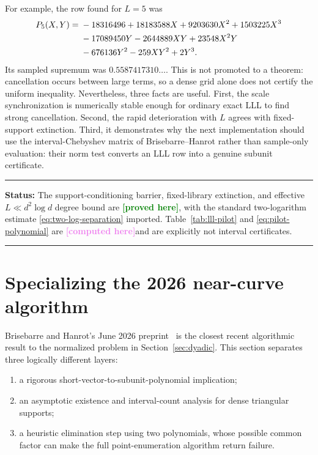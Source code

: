 \documentclass[11pt,oneside]{article}
\theoremstyle{definition}
\theoremstyle{remark}
\newcommand{\statusproved}{\textcolor{green}{\textbf{[proved here]}}}
\newcommand{\statuscomputed}{\textcolor{violet}{\textbf{[computed here]}}}
\newenvironment{statusbox}[1]
{\begin{center}\begin{minipage}{0.95\textwidth}\raggedright\hrule
\vspace{0.45em}\textbf{Status:} #1\par\vspace{0.35em}}
{\vspace{0.35em}\hrule\end{minipage}\end{center}}
\begin{document}
For example, the row found for $L=5$ was
\begin{align}
P_{5}(X,Y)={}&-18316496+18183588X+9203630X^2+1503225X^3 \notag\\
 &-17089450Y-2644889XY+23548X^2Y \notag\\
 &-676136Y^2-259XY^2+2Y^3.
\label{eq:pilot-polynomial}
\end{align}
Its sampled supremum was $0.5587417310\ldots$.  This is not promoted to a theorem: cancellation
occurs between large terms, so a dense grid alone does not certify the uniform inequality.
Nevertheless, three facts are useful.  First, the scale synchronization is numerically stable
enough for ordinary exact LLL to find strong cancellation.  Second, the rapid deterioration with
$L$ agrees with fixed-support extinction.  Third, it demonstrates why the next implementation
should use the interval-Chebyshev matrix of Brisebarre--Hanrot rather than sample-only evaluation:
their norm test converts an LLL row into a genuine subunit certificate.

\begin{statusbox}{The support-conditioning barrier, fixed-library extinction, and effective
$L\ll d^2\log d$ degree bound are \statusproved, with the standard two-logarithm estimate
\eqref{eq:two-log-separation} imported.  Table~\ref{tab:lll-pilot} and
\eqref{eq:pilot-polynomial} are \statuscomputed and are explicitly not interval certificates.}
\end{statusbox}

\section{Specializing the 2026 near-curve algorithm}
\label{sec:BH}

Brisebarre and Hanrot's June 2026 preprint~\cite{BrisebarreHanrot2026} is the closest recent
algorithmic result to the normalized problem in Section~\ref{sec:dyadic}.  This section separates
three logically different layers:

\begin{enumerate}
\item a rigorous short-vector-to-subunit-polynomial implication;
\item an asymptotic existence and interval-count analysis for dense triangular supports;
\item a heuristic elimination step using two polynomials, whose possible common factor can make the
full point-enumeration algorithm return failure.
\end{enumerate}
\end{document}
